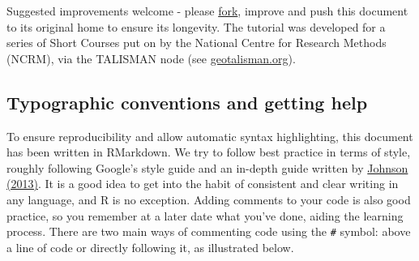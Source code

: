 \documentclass[]{article}
\begin{document}
Suggested improvements welcome - please
\href{https://help.github.com/articles/fork-a-repo}{fork}, improve and
push this document to its original home to ensure its longevity. The
tutorial was developed for a series of Short Courses put on by the
National Centre for Research Methods (NCRM), via the TALISMAN node (see
\href{http://www.geotalisman.org/}{geotalisman.org}).

\subsection{Typographic conventions and getting help}

To ensure reproducibility and allow automatic syntax highlighting, this
document has been written in RMarkdown. We try to follow best practice
in terms of style, roughly following Google's style guide and an
in-depth guide written by
\href{http://cran.r-project.org/web/packages/rockchalk/vignettes/Rstyle.pdf}{Johnson
(2013)}. It is a good idea to get into the habit of consistent and clear
writing in any language, and R is no exception. Adding comments to your
code is also good practice, so you remember at a later date what you've
done, aiding the learning process. There are two main ways of commenting
code using the \texttt{\#} symbol: above a line of code or directly
following it, as illustrated below.
\end{document}
